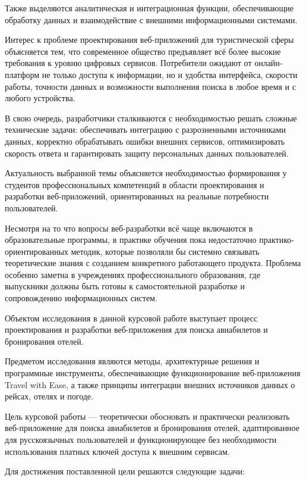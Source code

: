 \documentclass[14pt,a4paper,oneside]{extreport}
\begin{document}
Также выделяются аналитическая и интеграционная функции, обеспечивающие обработку данных и взаимодействие с внешними информационными системами.

Интерес к проблеме проектирования веб-приложений для туристической сферы объясняется тем, что современное общество предъявляет всё более высокие требования к уровню цифровых сервисов. Потребители ожидают от онлайн-платформ не только доступа к информации, но и удобства интерфейса, скорости работы, точности данных и возможности выполнения поиска в любое время и с любого устройства.

В свою очередь, разработчики сталкиваются с необходимостью решать сложные технические задачи: обеспечивать интеграцию с разрозненными источниками данных, корректно обрабатывать ошибки внешних сервисов, оптимизировать скорость ответа и гарантировать защиту персональных данных пользователей.

Актуальность выбранной темы объясняется необходимостью формирования у студентов профессиональных компетенций в области проектирования и разработки веб-приложений, ориентированных на реальные потребности пользователей.

Несмотря на то что вопросы веб-разработки всё чаще включаются в образовательные программы, в практике обучения пока недостаточно практико-ориентированных методик, которые позволяли бы системно связывать теоретические знания с созданием конкретного работающего продукта. Проблема особенно заметна в учреждениях профессионального образования, где выпускники должны быть готовы к самостоятельной разработке и сопровождению информационных систем.

Объектом исследования в данной курсовой работе выступает процесс проектирования и разработки веб-приложения для поиска авиабилетов и бронирования отелей.

Предметом исследования являются методы, архитектурные решения и программные инструменты, обеспечивающие функционирование веб-приложения Travel with Ease, а также принципы интеграции внешних источников данных о рейсах, отелях и погоде.

Цель курсовой работы — теоретически обосновать и практически реализовать веб-приложение для поиска авиабилетов и бронирования отелей, адаптированное для русскоязычных пользователей и функционирующее без необходимости использования платных ключей доступа к внешним сервисам.

Для достижения поставленной цели решаются следующие задачи:
\end{document}
